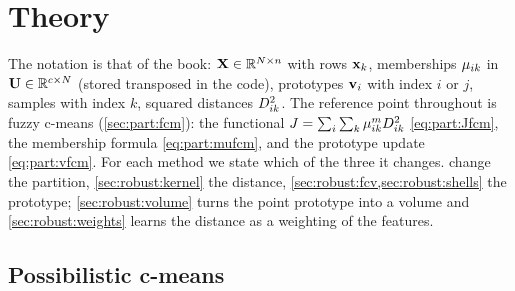 \section{Theory}\label{sec:robust:theory}

The notation is that of the book: $\mathbf{X}\in\mathbb{R}^{N\times n}$ with rows $\mathbf{x}_k$, memberships $\mu_{ik}$ in $\mathbf{U}\in\mathbb{R}^{c\times N}$ (stored transposed in the code), prototypes $\mathbf{v}_i$ with index $i$ or $j$, samples with index $k$, squared distances $D^2_{ik}$. The reference point throughout is fuzzy c-means (\cref{sec:part:fcm}): the functional $J=\sum_i\sum_k\mu_{ik}^mD^2_{ik}$ \eqref{eq:part:Jfcm}, the membership formula \eqref{eq:part:mufcm}, and the prototype update \eqref{eq:part:vfcm}. For each method we state which of the three it changes.  change the partition, \cref{sec:robust:kernel} the distance, \cref{sec:robust:fcv,sec:robust:shells} the prototype; \cref{sec:robust:volume} turns the point prototype into a volume and \cref{sec:robust:weights} learns the distance as a weighting of the features.

\subsection{Possibilistic c-means}\label{sec:robust:pcm}

